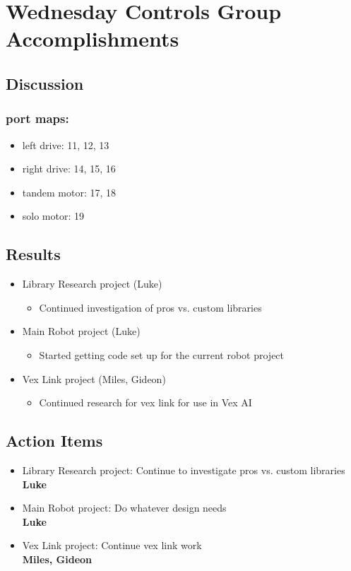 \section{Wednesday Controls Group Accomplishments}

\subsection{Discussion}

\subsubsection{port maps:}
\begin{itemize}
    \item left drive: 11, 12, 13
    \item right drive: 14, 15, 16
    \item tandem motor: 17, 18
    \item solo motor: 19
\end{itemize}

\subsection{Results}
\begin{itemize}
    \item Library Research project (Luke)
    \begin{itemize}
        \item Continued investigation of pros vs. custom libraries
    \end{itemize}
    \item Main Robot project (Luke)
    \begin{itemize}
        \item Started getting code set up for the current robot project
    \end{itemize}
    \item Vex Link project (Miles, Gideon)
    \begin{itemize}
        \item Continued research for vex link for use in Vex AI
    \end{itemize}
\end{itemize}

\subsection{Action Items}
\begin{itemize}
    \item Library Research project: Continue to investigate pros vs. custom libraries\\
    \textbf{Luke}
    \item Main Robot project: Do whatever design needs\\
    \textbf{Luke}
    \item Vex Link project: Continue vex link work\\
    \textbf{Miles, Gideon}
\end{itemize}